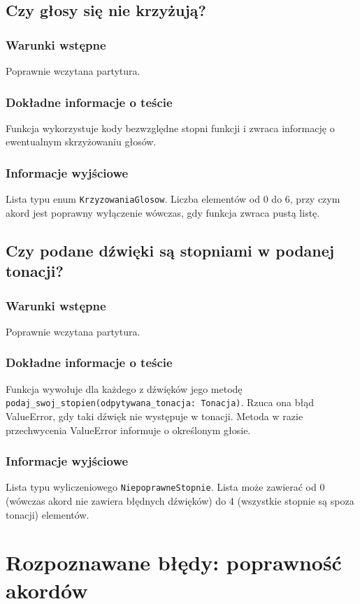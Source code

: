 \documentclass[dokumentacja.tex]{subfiles}
\begin{document}
\subsection{Czy głosy się nie krzyżują?}
\subsubsection{Warunki wstępne}
Poprawnie wczytana partytura.
\subsubsection{Dokładne informacje o teście}
Funkcja wykorzystuje kody bezwzględne stopni funkcji i zwraca informację o ewentualnym skrzyżowaniu głosów.
\subsubsection{Informacje wyjściowe}
Lista typu enum \texttt{KrzyzowaniaGlosow}. Liczba elementów od 0 do 6, przy czym akord jest poprawny wyłączenie wówczas, gdy funkcja zwraca pustą listę.

\subsection{Czy podane dźwięki są stopniami w podanej tonacji?}
\subsubsection{Warunki wstępne}
Poprawnie wczytana partytura.
\subsubsection{Dokładne informacje o teście}
Funkcja wywołuje dla każdego z dźwięków jego metodę \texttt{podaj\_swoj\_stopien(odpytywana\_tonacja: Tonacja)}. Rzuca ona błąd ValueError, gdy taki dźwięk nie występuje w tonacji. Metoda w razie przechwycenia ValueError informuje o określonym głosie.
\subsubsection{Informacje wyjściowe}
Lista typu wyliczeniowego \texttt{NiepoprawneStopnie}. Lista może zawierać od 0 (wówczas akord nie zawiera błędnych dźwięków) do 4 (wszystkie stopnie są spoza tonacji) elementów.

\section{Rozpoznawane błędy: poprawność akordów}
\end{document}
